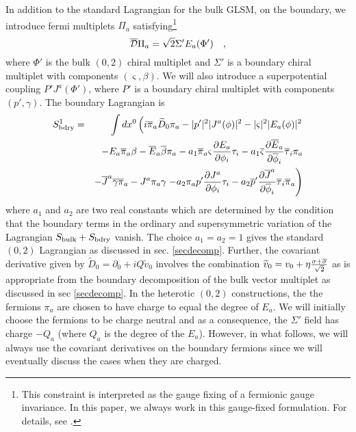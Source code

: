 \documentclass[a4paper,12pt]{article}
\begin{document}
In addition to the standard Lagrangian for the bulk GLSM, on the boundary,
we introduce fermi multiplets $\Pi_a$ satisfying\footnote{This
constraint is interpreted as the gauge fixing of a fermionic gauge
invariance. In this paper, we always work in this gauge-fixed formulation.
For details, see \cite{wittenphases,zerotwo}.}
\begin{equation}
\overline{\cal D} \Pi_a = \sqrt2 \Sigma' E_a(\Phi')\quad,
\end{equation}
where $\Phi'$ is the bulk $(0,2)$ chiral multiplet and $\Sigma'$
is a boundary chiral multiplet with components $(\varsigma,\beta)$. 
We will also introduce a superpotential coupling $P' J^a(\Phi')$, where
$P'$ is a boundary chiral multiplet with components $(p',\gamma)$.
The boundary Lagrangian is 
\begin{eqnarray}
S^{1}_{\rm bdry} &=& \int dx^0 \left(
i\overline{\pi}_a\widetilde{D}_0 \pi_a - |p'|^2|J^a(\phi)|^2 -
|\varsigma|^2|E_a(\phi)|^2 \right.  \nonumber \\
&&- E_a \overline{\pi}_a \beta
- \overline{E}_a \overline{\beta} \pi_a 
- a_1 \overline{\pi}_a
\varsigma{{\partial E_a}\over{\partial \phi_i}}\tau_i 
- a_1 \overline{\varsigma}
{{\partial \overline{E}_a}\over{\partial \overline{\phi}_i}}
\overline{\tau}_i \pi_a  \\
&&- \overline{J}^a \overline{\gamma}\overline{\pi}_a 
- J^a \pi_a \gamma
\left.
-a_2 \pi_a p' {{\partial J^a}\over{\partial \phi_i}} \tau_i 
-a_2 \overline{p}'{{\partial \overline{J}^a}\over{\partial
\overline{\phi}_i}} \overline{\tau}_i  \overline{\pi}_a
\right) \nonumber
\end{eqnarray}
where $a_1$ and $a_2$ are two real constants which are determined by the
condition that the boundary terms in the ordinary and supersymmetric
variation of the Lagrangian
$S_{\rm bulk} + S_{\rm bdry}$  vanish. The choice $a_1=a_2=1$
gives the standard $(0,2)$ Lagrangian as discussed in sec.
\ref{secdecomp}.
Further, the covariant derivative given by
$\widetilde{D}_0 = \partial_0 +iQ \widetilde{v}_0$ involves the combination
$\widetilde{v}_0=v_0 + \eta {{\sigma+\overline{\sigma}}\over\sqrt2}$
as is appropriate from the boundary decomposition of
the bulk vector multiplet as discussed in sec \ref{secdecomp}. 
In the heterotic $(0,2)$ constructions, the
the fermions $\pi_a$ are chosen to have charge
to equal the degree of $E_a$. We will  initially choose the fermions to
be charge neutral and as a consequence, the $\Sigma'$ field has charge
$-Q_a$ (where $Q_a$ is the degree of the $E_a$). However, in what
follows, we will always use the covariant derivatives on the boundary
fermions since we will eventually discuss the cases when they are
charged.
\end{document}
